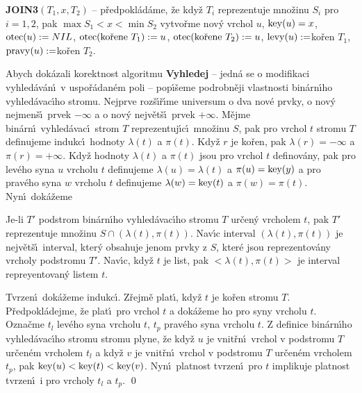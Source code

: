 {\bf JOIN3$(T_1,x,T_2)$} -- p\v redpokl\'ad\'ame, \v ze kdy\v z $
T_i$ reprezentuje 
mno\v zinu $S_i$ pro $i=1,2$, pak $\max S_1<x<\min S_2$\newline 
vytvo\v rme nov\'y vrchol $u$, $\operatorname{key}(u)=x$, $\operatorname{otec}(u):=NIL$, \newline 
$\otec(\text{ko\v rene }T_1):=u$, $\otec(\text{ko\v rene }T_2):=u$, \newline 
$\operatorname{levy}(u):=$ko\v ren $T_1$, $\operatorname{pravy}(u):=$ko\v ren $T_2$.
\medskip


\flushpar Abych dok\'azali korektnost algoritmu {\bf Vyhledej} -- 
jedn\'a se o modifikaci vyhled\'av\'an\'\i\ v uspo\v r\'adan\'em poli --
pop\'\i\v seme po\-drobn\v eji vlastnosti bin\'arn\'\i ho vyhled\'avac\'\i ho 
stromu. Nej\-prve roz\v s\'\i \v r\'\i me universum o dva nov\'e prvky, o nov\'y 
nejmen\v s\'\i\ prvek $-\infty$ a o nov\'y nejv\v et\v s\'\i\ prvek $+\infty$. 
M\v ejme bin\'arn\'\i\ vyhled\'avac\'\i\ strom $T$ reprezentuj\'\i c\'\i\ 
mno\v zinu $S$, pak pro vrchol $t$ stromu $T$ definujeme indukc\'\i\ hodnoty $\lambda(t)$ 
a $\pi(t)$. Kdy\v z $r$ je ko\v ren, pak $\lambda(r)=-\infty$ a $\pi(r)=+\infty$. 
Kdy\v z hodnoty $\lambda(t)$ a $\pi(t)$ jsou pro vrchol $t$ definov\'any, pak pro lev\'eho syna $u$ vrcholu $t$ definujeme $\lambda(u)=\lambda(t)$ a $\pi(u)=\operatorname{key}(y)$
a pro prav\'eho syna $w$ vrcholu $t$ definujeme $\lambda(w)=\operatorname{key}(t)$ a $\pi(w)=\pi(t)$.
Nyn\'\i\ dok\'a\v zeme


Je-li $T'$ podstrom bin\'arn\'\i ho vyhled\'avac\'\i ho 
stromu $T$ ur\v cen\'y vrcholem $t$, pak $T'$ reprezentuje mno\v zinu 
$S\cap (\lambda (t),\pi (t))$. Nav\'\i c interval $(\lambda (t),\pi 
(t))$ je nejv\v et\v s\'\i\ interval, 
kter\'y obsahuje jenom prvky z $S$, kter\'e jsou reprezentov\'any 
vrcholy podstromu $T'$. Nav\'\i c, kdy\v z $t$ je list, pak $<\lambda(t),\pi(t)>$ je interval repreyentovan\'y listem $t$.
\endproclaim


Tvrzen\'\i\ dok\'a\v zeme indukc\'\i .  Z\v rejm\v e plat\'\i , 
kdy\v z $t$ je ko\v ren stromu $T$.  P\v redpokl\'adej\-me, \v ze plat\'\i\ pro vrchol 
$t$ a dok\'a\-\v ze\-me ho pro syny vrcholu $t$.  Ozna\v cme $t_l$ lev\'eho syna 
vrcholu $t$, $t_p$ prav\'eho syna vrcholu $t$.  Z definice bin\'arn\'\i ho 
vyhled\'avac\'\i ho stromu stromu plyne, \v ze kdy\v z $u$ je vnit\v rn\'\i\ 
vrchol v podstromu $T$ ur\v cen\'em vrcholem $t_l$ a kdy\v z $v$ je vnit\v rn\'\i\ 
vrchol v podstromu $T$ ur\v cen\'em vrcholem $t_p$, pak 
$\operatorname{key}(u)<\operatorname{key}(t)<\operatorname{key}(v)$.  Nyn\'\i\ platnost tvrzen\'\i\ pro $t$ 
implikuje platnost tvrzen\'\i\ i pro vrcholy $t_l$ a $t_p$.  \qed
\enddemo
\medskip

